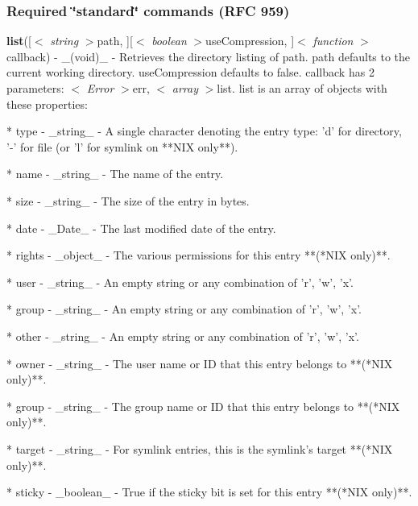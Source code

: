 \subsubsection*{Required \char`\"{}standard\char`\"{} commands (R\+FC 959)}


\begin{DoxyItemize}
\item {\bfseries list}(\mbox{[}$<$ {\itshape string} $>$path, \mbox{]}\mbox{[}$<$ {\itshape boolean} $>$use\+Compression, \mbox{]}$<$ {\itshape function} $>$callback) -\/ \+\_\+(void)\+\_\+ -\/ Retrieves the directory listing of {\ttfamily path}. {\ttfamily path} defaults to the current working directory. {\ttfamily use\+Compression} defaults to false. {\ttfamily callback} has 2 parameters\+: $<$ {\itshape Error} $>$err, $<$ {\itshape array} $>$list. {\ttfamily list} is an array of objects with these properties\+: \begin{DoxyVerb}* type - _string_ - A single character denoting the entry type: 'd' for directory, '-' for file (or 'l' for symlink on **\*NIX only**).

* name - _string_ - The name of the entry.

* size - _string_ - The size of the entry in bytes.

* date - _Date_ - The last modified date of the entry.

* rights - _object_ - The various permissions for this entry **(*NIX only)**.

    * user - _string_ - An empty string or any combination of 'r', 'w', 'x'.

    * group - _string_ - An empty string or any combination of 'r', 'w', 'x'.

    * other - _string_ - An empty string or any combination of 'r', 'w', 'x'.

* owner - _string_ - The user name or ID that this entry belongs to **(*NIX only)**.

* group - _string_ - The group name or ID that this entry belongs to **(*NIX only)**.

* target - _string_ - For symlink entries, this is the symlink's target **(*NIX only)**.

* sticky - _boolean_ - True if the sticky bit is set for this entry **(*NIX only)**.
\end{DoxyVerb}


\end{DoxyItemize}
